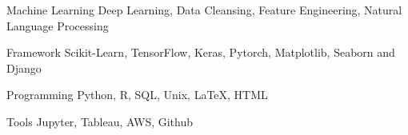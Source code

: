 


\begin{cvskills}




\cvskill
{Machine Learning} %
{Deep Learning, Data Cleansing, Feature Engineering, Natural Language Processing} %


\cvskill
{Framework} %
{Scikit-Learn, TensorFlow, Keras, Pytorch, Matplotlib, Seaborn and Django} %


\cvskill
{Programming} %
{Python, R, SQL, Unix, LaTeX, HTML} %


\cvskill
{Tools} %
{Jupyter, Tableau, AWS, Github} %


\end{cvskills}